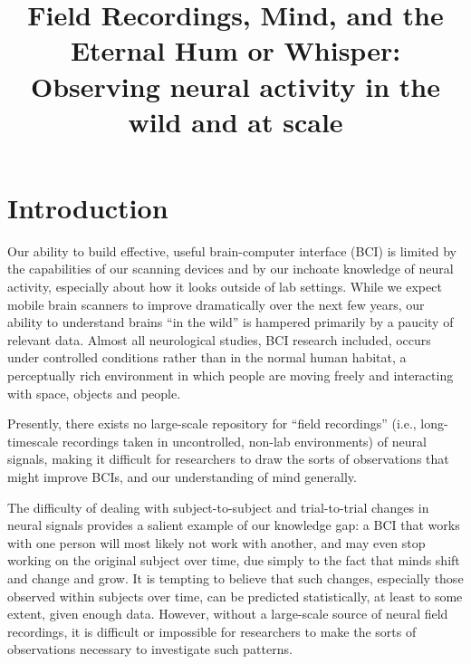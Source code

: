 \documentclass[a4paper,twoside]{article}
\begin{document}
\title{Field Recordings, Mind, and the Eternal Hum or Whisper: Observing neural activity in the wild and at scale}

\author{
}






\onecolumn \maketitle \normalsize \vfill




\section{Introduction}

Our ability to build effective, useful brain-computer interface (BCI) is limited by the capabilities of our scanning devices and by our inchoate knowledge of neural activity, especially about how it looks outside of lab settings. While we expect mobile brain scanners to improve dramatically over the next few years, our ability to understand brains ``in the wild'' is hampered primarily by a paucity of relevant data. Almost all neurological studies, BCI research included, occurs under controlled conditions rather than in the normal human habitat, a perceptually rich environment in which people are moving freely and interacting with space, objects and people.

Presently, there exists no large-scale repository for ``field recordings'' (i.e., long-timescale recordings taken in uncontrolled, non-lab environments) of neural signals, making it difficult for researchers to draw the sorts of observations that might improve BCIs, and our understanding of mind generally.

The difficulty of dealing with subject-to-subject and trial-to-trial changes in neural signals provides a salient example of our knowledge gap: a BCI that works with one person will most likely not work with another, and may even stop working on the original subject over time, due simply to the fact that minds shift and change and grow. It is tempting to believe that such changes, especially those observed within subjects over time, can be predicted statistically, at least to some extent, given enough data. However, without a large-scale source of neural field recordings, it is difficult or impossible for researchers to make the sorts of observations necessary to investigate such patterns.
\end{document}
